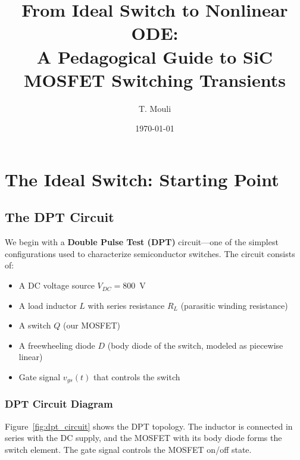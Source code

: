 \documentclass[11pt, a4paper]{article}
\title{From Ideal Switch to Nonlinear ODE: \\
A Pedagogical Guide to SiC MOSFET Switching Transients}
\author{T. Mouli}
\date{\today}
\newcommand{\vdc}{V_{DC}}
\begin{document}
\maketitle

\tableofcontents
\newpage

\section{The Ideal Switch: Starting Point}

\subsection{The DPT Circuit}

We begin with a \textbf{Double Pulse Test (DPT)} circuit—one of the simplest configurations used to characterize semiconductor switches. The circuit consists of:

\begin{itemize}
    \item A DC voltage source $\vdc = 800\,\text{ V}$
    \item A load inductor $L$ with series resistance $R_L$ (parasitic winding resistance)
    \item A switch $Q$ (our MOSFET)
    \item A freewheeling diode $D$ (body diode of the switch, modeled as piecewise linear)
    \item Gate signal $v_{gs}(t)$ that controls the switch
\end{itemize}

\subsubsection{DPT Circuit Diagram}

Figure~\ref{fig:dpt_circuit} shows the DPT topology. The inductor is connected in series with the DC supply, and the MOSFET with its body diode forms the switch element. The gate signal controls the MOSFET on/off state.
\end{document}
